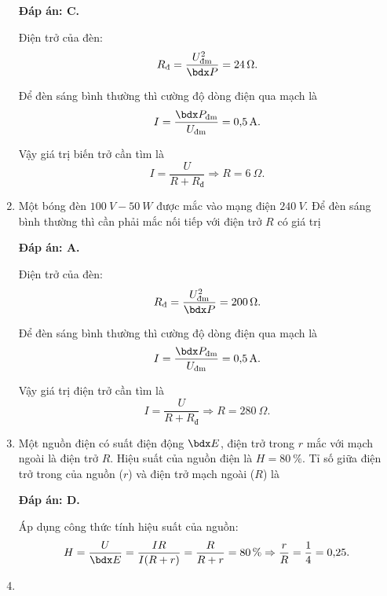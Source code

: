 \begin{enumerate}[label=\bfseries Câu \arabic*:]
{	}
	\loigiai
	{	\textbf{Đáp án: C.}
		
		Điện trở của đèn:
		$$R_\text{đ} = \dfrac{U_\text{đm}^2}{\calP} = \SI{24}{\Omega}.$$
		
		Để đèn sáng bình thường thì cường độ dòng điện qua mạch là
		$$I=\dfrac{\calP_\text{đm}}{U_\text{đm}} = \SI{0.5}{A}.$$
		
		Vậy giá trị biến trở cần tìm là
		$$I=\dfrac{U}{R + R_\text{đ}} \Rightarrow R = \SI{6}{\Omega}.$$
	}
	\item {}
	
	\cauhoi
	{Một bóng đèn $\SI{100}{V} - \SI{50}{W}$ được mắc vào mạng điện $\SI{240}{V}$. Để đèn sáng bình thường thì cần phải mắc nối tiếp với điện trở $R$ có giá trị
		
	}
	\loigiai
	{	\textbf{Đáp án: A.}
		
		Điện trở của đèn:
		$$R_\text{đ} = \dfrac{U_\text{đm}^2}{\calP} = \SI{200}{\Omega}.$$
		
		Để đèn sáng bình thường thì cường độ dòng điện qua mạch là
		$$I=\dfrac{\calP_\text{đm}}{U_\text{đm}} = \SI{0.5}{A}.$$
		
		Vậy giá trị điện trở cần tìm là
		$$I=\dfrac{U}{R + R_\text{đ}} \Rightarrow R = \SI{280}{\Omega}.$$
	}
	\item {}
	
	\cauhoi
	{Một nguồn điện có suất điện động $\calE$, điện trở trong $r$ mắc với mạch ngoài là điện trở $R$. Hiệu suất của nguồn điện là $H=\SI{80}{\percent}$. Tỉ số giữa điện trở trong của nguồn ($r$) và điện trở mạch ngoài ($R$) là
		
	}
	\loigiai
	{	\textbf{Đáp án: D.}
		
		Áp dụng công thức tính hiệu suất của nguồn:
		$$H=\dfrac{U}{\calE} = \dfrac{IR}{I(R+r)} = \dfrac{R}{R + r} = \SI{80}{\percent} \Rightarrow \dfrac{r}{R} = \dfrac{1}{4} = \SI{0.25}{}.$$
	}
	\item {}
	

\end{enumerate}
